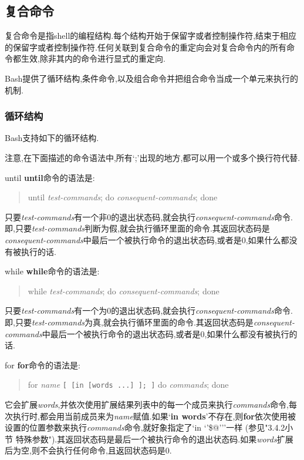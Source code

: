 \documentclass[draft,openany]{book}
\begin{document}
\begin{CJK}{UTF8}{gbsn}
    \subsection{复合命令}
    复合命令是指shell的编程结构.每个结构开始于保留字或者控制操作符,结束于相应的保留字或者控制操作符.任何关联到复合命令的重定向会对复合命令内的所有命令都生效,除非其内的命令进行显式的重定向.\par
    Bash提供了循环结构,条件命令,以及组合命令并把组合命令当成一个单元来执行的机制.

    \subsubsection{循环结构}
    Bash支持如下的循环结构.\par
    注意,在下面描述的命令语法中,所有`;'出现的地方,都可以用一个或多个换行符代替.\par
    \begin{basedescript}{\desclabelstyle{\nextlinelabel}\desclabelwidth{2.5em}}
    \item[until] \textbf{until}命令的语法是:
        \begin{quote}
            until \emph{test-commands}; do \emph{consequent-commands}; done
        \end{quote}
        只要\emph{test-commands}有一个非0的退出状态码,就会执行\emph{consequent-commands}命令.即,只要\emph{test-commands}判断为假,就会执行循环里面的命令.其返回状态码是\emph{consequent-commands}中最后一个被执行命令的退出状态码,或者是0,如果什么都没有被执行的话.
    \item[while] \textbf{while}命令的语法是:
        \begin{quote}
            while \emph{test-commands}; do \emph{consequent-commands}; done
        \end{quote}
        只要\emph{test-commands}有一个为0的退出状态码,就会执行\emph{consequent-commands}命令.即,只要\emph{test-commands}为真,就会执行循环里面的命令.其返回状态码是\emph{consequent-commands}中最后一个被执行命令的退出状态码,或者是0,如果什么都没有被执行的话.
    \item[for] \textbf{for}命令的语法是:
        \begin{quote}
            for \emph{name} \verb+[ [in [words ...] ]; ]+ do \emph{commands}; done
        \end{quote}
        它会扩展\emph{words},并依次使用扩展结果列表中的每一个成员来执行\emph{commands}命令,每次执行时,都会用当前成员来为\emph{name}赋值.如果`\textbf{in words}'不存在,则\textbf{for}依次使用被设置的位置参数来执行\emph{commands}命令,就好象指定了`in `'\$@'''一样 (参见"3.4.2小节 特殊参数").其返回状态码是最后一个被执行命令的退出状态码.如果\emph{words}扩展后为空,则不会执行任何命令,且返回状态码是0.\par

\end{basedescript}
\end{CJK}
\end{document}
